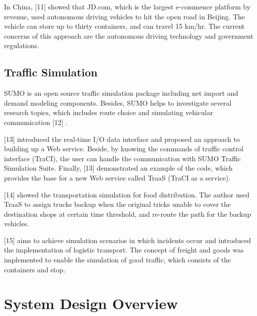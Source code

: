 \documentclass[12pt]{ksthesis}
\begin{document}
\begin{thesis}
{%
In China, [11] \cite{Delivery2017} showed that JD.com, which is the largest e-commence platform by revenue, used autonomous driving vehicles to hit the open road in Beijing. The vehicle can store up to thirty containers, and can travel 15 km/hr. The current concerns of this approach are the autonomous driving technology and government regulations.

\section{Traffic Simulation}
SUMO is an open source traffic simulation package including net import and demand modeling components. Besides, SUMO helps to investigate several research topics, which includes route choice and simulating vehicular communication [12] \cite{Krajzewicz2007}.

[13] \cite{10.1007/978-3-662-45079-6_5} introduced the real-time I/O data interface and proposed an approach to building up a Web service. Beside, by knowing the commands of traffic control interface (TraCI), the user can handle the communication with SUMO Traffic Simulation Suite. Finally, [13] \cite{10.1007/978-3-662-45079-6_5} demonstrated an example of the code, which provides the base for a new Web service called TraaS (TraCI as a service).

[14] \cite{Tunku2016} showed the transportation simulation for food distribution. The author used TraaS to assign trucks backup when the original tricks unable to cover the destination shops at certain time threshold, and re-route the path for the backup vehicles.

[15] \cite{Kendziorra2015} aims to achieve simulation scenarios in which incidents occur and introduced the implementation of logistic transport. The concept of freight and goods was implemented to enable the simulation of good traffic, which consists of the containers and stop.






\chapter{System Design Overview}\label{Chap:Architecture}

}
\end{thesis}
\end{document}

